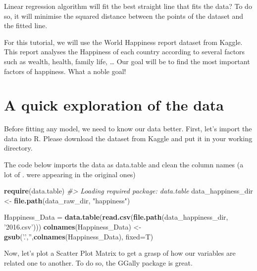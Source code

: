 \documentclass[]{book}
\newenvironment{Shaded}{\begin{snugshade}}{\end{snugshade}}
\newcommand{\CommentTok}[1]{\textcolor[rgb]{0.56,0.35,0.01}{\textit{#1}}}
\newcommand{\DataTypeTok}[1]{\textcolor[rgb]{0.13,0.29,0.53}{#1}}
\newcommand{\KeywordTok}[1]{\textcolor[rgb]{0.13,0.29,0.53}{\textbf{#1}}}
\newcommand{\NormalTok}[1]{#1}
\newcommand{\StringTok}[1]{\textcolor[rgb]{0.31,0.60,0.02}{#1}}
\begin{document}
Linear regression algorithm will fit the best straight line that fits the data? To do so, it will minimise the squared distance between the points of the dataset and the fitted line.

For this tutorial, we will use the World Happiness report dataset from Kaggle. This report analyses the Happiness of each country according to several factors such as wealth, health, family life, \ldots{} Our goal will be to find the most important factors of happiness. What a noble goal!

\hypertarget{a-quick-exploration-of-the-data}{%
\section{A quick exploration of the data}\label{a-quick-exploration-of-the-data}}

Before fitting any model, we need to know our data better. First, let's import the data into R. Please download the dataset from Kaggle and put it in your working directory.

The code below imports the data as data.table and clean the column names (a lot of . were appearing in the original ones)

\begin{Shaded}
\begin{Highlighting}[]
\KeywordTok{require}\NormalTok{(data.table)}
\CommentTok{#> Loading required package: data.table}
\NormalTok{data_happiness_dir <-}\StringTok{ }\KeywordTok{file.path}\NormalTok{(data_raw_dir, }\StringTok{"happiness"}\NormalTok{)}

\NormalTok{Happiness_Data =}\StringTok{ }\KeywordTok{data.table}\NormalTok{(}\KeywordTok{read.csv}\NormalTok{(}\KeywordTok{file.path}\NormalTok{(data_happiness_dir, }\StringTok{'2016.csv'}\NormalTok{)))}
\KeywordTok{colnames}\NormalTok{(Happiness_Data) <-}\StringTok{ }\KeywordTok{gsub}\NormalTok{(}\StringTok{'.'}\NormalTok{,}\StringTok{''}\NormalTok{,}\KeywordTok{colnames}\NormalTok{(Happiness_Data), }\DataTypeTok{fixed=}\NormalTok{T)}
\end{Highlighting}
\end{Shaded}

Now, let's plot a Scatter Plot Matrix to get a grasp of how our variables are related one to another. To do so, the GGally package is great.
\end{document}

